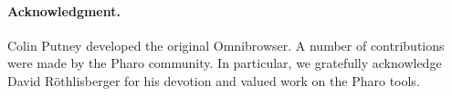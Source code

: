 \documentclass[a4paper,10pt,twoside]{book}
\begin{document}
\paragraph{Acknowledgment.}
Colin Putney developed the original Omnibrowser.
A number of contributions were made by the Pharo community. In particular, we gratefully acknowledge David R\"othlisberger for his devotion and valued work on the Pharo tools.



%
% 


\end{document}
